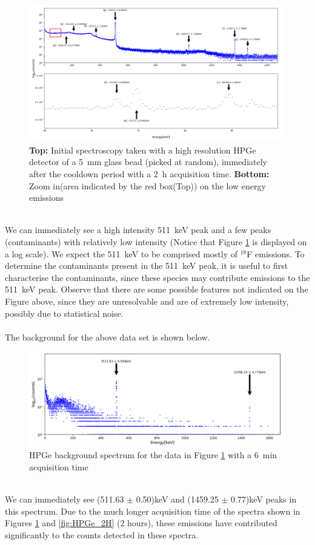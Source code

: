 \documentclass[]{article}
\begin{document}
\begin{figure}[h!]
	\includegraphics[scale = 0.42]{HPGe_initial.png}
	\centering
	\captionsetup{justification=centering,margin=1cm}
	\caption{\textbf{Top:} Initial spectroscopy taken with a high resolution HPGe detector of a \SI{5}{\milli \metre} glass bead (picked at random), immediately after the cooldown period with a \SI{2}{\hour} acquisition time. \textbf{Bottom:} Zoom in(area indicated by the red box(Top)) on the low energy emissions}
	\label{fig:HPGe_Initial}
\end{figure}~\\
We can immediately see a high intensity \SI{511}{\kilo \electronvolt} peak and a few peaks (contaminants) with relatively low intensity (Notice that Figure \ref{fig:HPGe_Initial} is displayed on a log scale). We expect the \SI{511}{\kilo \electronvolt} to be comprised mostly of ${}^{18}$F emissions. To determine the contaminants present in the \SI{511}{\kilo \electronvolt} peak, it is useful to first characterise the contaminants, since these species may contribute emissions to the \SI{511}{\kilo \electronvolt} peak. Observe that there are some possible features not indicated on the Figure above, since they are unresolvable and are of extremely low intensity, possibly due to statistical noise.\\\\
The background for the above data set is shown below.
\begin{figure}[h!]
	\includegraphics[scale = 0.55]{background.png}
	\centering
	\captionsetup{justification=centering,margin=2cm}
	\caption{HPGe background spectrum for the data in Figure \ref{fig:HPGe_Initial} with a \SI{6}{\minute} acquisition time}
	\label{fig:HPGe_Initial_background}
\end{figure}~\\
We can immediately see (511.63 $\pm$ 0.50)keV and (1459.25 $\pm$ 0.77)keV peaks in this spectrum. Due to the much longer acquisition time of the spectra shown in Figures \ref{fig:HPGe_Initial} and \ref{fig:HPGe_2H} (2 hours), these emissions have contributed significantly to the counts detected in these spectra. 
\end{document}
